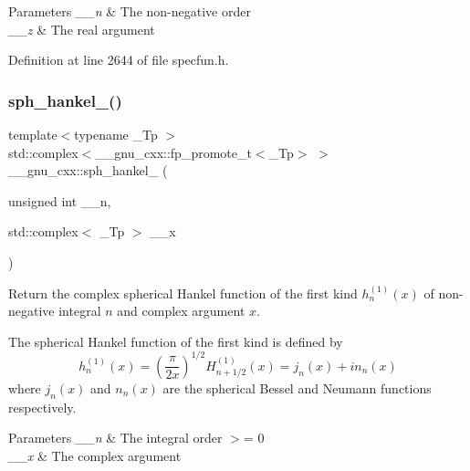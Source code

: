 \begin{DoxyParams}{Parameters}
{\em \+\_\+\+\_\+n} & The non-\/negative order \\
\hline
{\em \+\_\+\+\_\+z} & The real argument \\
\hline
\end{DoxyParams}


Definition at line 2644 of file specfun.\+h.

\mbox{\label{group__gnu__math__spec__func_ga3d256857c000a966e89526cb99253aca}} 
\subsubsection{\texorpdfstring{sph\+\_\+hankel\+\_()}{sph\_hankel\_1()}\hspace{0.1cm}{\footnotesize\ttfamily [2/2]}}
{\footnotesize\ttfamily template$<$typename \+\_\+\+Tp $>$ \\
std\+::complex$<$\+\_\+\+\_\+gnu\+\_\+cxx\+::fp\+\_\+promote\+\_\+t$<$\+\_\+\+Tp$>$ $>$ \+\_\+\+\_\+gnu\+\_\+cxx\+::sph\+\_\+hankel\+\_ (\begin{DoxyParamCaption}\item[{unsigned int}]{\+\_\+\+\_\+n,  }\item[{std\+::complex$<$ \+\_\+\+Tp $>$}]{\+\_\+\+\_\+x }\end{DoxyParamCaption})\hspace{0.3cm}{\ttfamily [inline]}}

Return the complex spherical Hankel function of the first kind $ h^{(1)}_n(x) $ of non-\/negative integral $ n $ and complex argument $ x $.

The spherical Hankel function of the first kind is defined by \[ h^{(1)}_n(x) = \left(\frac{\pi}{2x} \right) ^{1/2} H^{(1)}_{n+1/2}(x) = j_n(x) + i n_n(x) \] where $ j_n(x) $ and $ n_n(x) $ are the spherical Bessel and Neumann functions respectively.


\begin{DoxyParams}{Parameters}
{\em \+\_\+\+\_\+n} & The integral order $>$= 0 \\
\hline
{\em \+\_\+\+\_\+x} & The complex argument \\
\hline
\end{DoxyParams}


